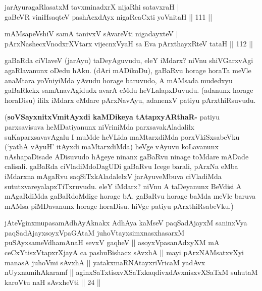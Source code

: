 
\begin{shl}
jarAyuragaRlasatxM tavxminadxrX nijaRhi satavxraH | \\
gaBeVR viniHsaqteV pashAcxdAyx nigaRcaCxti yoVnitaH \hfill|| 111 || 
\end{shl}

\begin{shl}
mAMsapeVshiV samA tanivxV sA\s vareVti nigadayxteV | \\
pArxNashecxVnodxrXV\s tarx vijecnxVyaH sa Eva pArxthayxRteV tataH \hfill|| 112 || 
\end{shl}

\begin{artha}
gaBaRda ciVlaveV (jarAyu) taDeyAguvudu, eleY iMdarx? niVnu shiVGarxvAgi 
agaRlavanunx oDedu hAku. (dAri mADikoDu), gaBaRvu horage horaTa meVle 
anaMtara yoVniyiMda yAvudu horage baruvudo, A mAMsada mudedxyu 
gaBaRkekx samAnavAgidudx avarA eMdu heVLalapxDuvudu. (adanunx horage 
horaDisu) ililx iMdarx eMdare pArxNavAyu, adanenxV patiyu 
pArxthiRsuvudu.

(\textbf{soVSayxnitxVmitAyxdi kaMDikeya tAtapxyARthaR-} patiyu 
parxsavisuva heMDatiyanunx niVriniMda parxsavakAladalilx 
suKaparxsavavAgalu I muMde heVLida maMtarxdiMda porxVkiSxsabeVku 
(`yathA vAyuH' itAyxdi maMtarxdiMda) heVge vAyuvu koLavanunx 
nAshapaDisade ADisuvudo hAgeye ninanx gaBaRvu ninage toMdare mADade 
calisali. gaBaRda ciVladiMdoDagUDi gaBaRvu Icege barali, pArxNa eMba 
iMdarxna mAgaRvu saqSiTxkAladalelxV jarAyuveMbuva ciVladiMda 
sututxvareyalapxTiTxruvudu. eleY iMdarx? niVnu A taDeyanunx BeVdisi A 
mAgaRdiMda gaBaRdoMdige horage bA. gaBaRvu horage baMda meVle baruva 
mAMsa piMDavanunx horage horaDisu. hiVge patiyu pArxthiRsabeVku.)
\end{artha}

\begin{kandikeshl}
jAteV\s ginxmupasamAdhAyAknakx AdhAya kaMseV paqSadAjayxM saninxVya paqSadAjayxsoyxVpaGAtaM juhoVtayxsimxnasxhasarxM puSAyxsameVdhamAnaH sevxV gaqheV || asoyxVpasanAdxyXM mA ceCxYtisxVtapxrXjayA ca pashuBishacx sAvxhA || mayi pArxNAMsatxvXyi manasA juhoVmi sAvxhA || yatakxmaRNAtayxriVricaM yadAvx nUyxnamihAkaramf || aginxSaTxtisxvXSaTxkaqdivxdAvxnisxvXSaTxM suhutaM karoVtu naH sAvxheVti || 24 ||
\end{kandikeshl}


